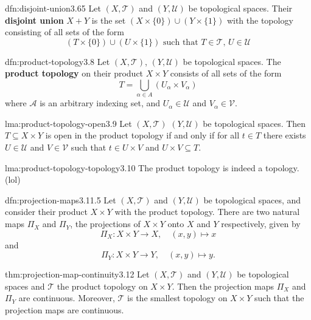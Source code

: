 \documentclass[landscape, 8pt]{extarticle}
\begin{document}
\begin{multicols}{3}
\begin{dfn}{dfn:disjoint-union}{3.65}
    Let $(X, \mathcal{T})$ and $(Y, \mathcal{U})$ be topological spaces. Their \textbf{disjoint union} $X + Y$ is the set $(X \times \{0\}) \cup (Y \times \{1\})$ with the topology consisting of all sets of the form
    \[(T \times \{0\}) \cup (U \times \{1\})\text{ such that }T \in \mathcal{T},\,U \in \mathcal{U}\]
\end{dfn}

\begin{dfn}{dfn:product-topology}{3.8}
    Let $(X, \mathcal{T})$, $(Y, \mathcal{U})$ be topological spaces. The \textbf{product topology} on their product $X \times Y$ consists of all sets of the form
    \[T = \bigcup_{\alpha\in A} (U_{\alpha} \times V_{\alpha})\]
    where $\mathcal{A}$ is an arbitrary indexing set, and $U_{\alpha}\in \mathcal{U}$ and $V_{\alpha}\in \mathcal{V}$.
\end{dfn}

\begin{lma}{lma:product-topology-open}{3.9}
    Let $(X, \mathcal{T})$ $(Y, \mathcal{U})$ be topological spaces. Then $T \subseteq X \times Y$ is open in the product topology if and only if for all $t\in T$ there exists $U \in \mathcal{U}$ and $V \in \mathcal{V}$ such that $t \in U \times V$ and $U \times V \subseteq T$.
\end{lma}

\begin{lma}{lma:product-topology-topology}{3.10}
    The product topology is indeed a topology. (lol)
\end{lma}

\begin{dfn}{dfn:projection-maps}{3.11.5}
    Let $(X, \mathcal{T})$ and $(Y, \mathcal{U})$ be topological spaces, and consider their product $X \times Y$ with the product topology. There are two natural maps $\Pi_{X}$ and $\Pi_{Y}$, the projections of $X \times Y$ onto $X$ and $Y$ respectively, given by
    \[\Pi_{X} : X \times Y \to X, \quad (x, y) \mapsto x\]
    and
    \[\Pi_{Y} : X \times Y \to Y, \quad (x, y) \mapsto y.\]
\end{dfn}

\begin{thm}{thm:projection-map-continuity}{3.12}
    Let $(X, \mathcal{T})$ and $(Y, \mathcal{U})$ be topological spaces and $\mathcal{T}$ the product topology on $X \times Y$. Then the projection maps $\Pi_{X}$ and $\Pi_{Y}$ are continuous. Moreover, $\mathcal{T}$ is the smallest topology on $X \times Y$ such that the projection maps are continuous.
\end{thm}


\end{multicols}
\end{document}
